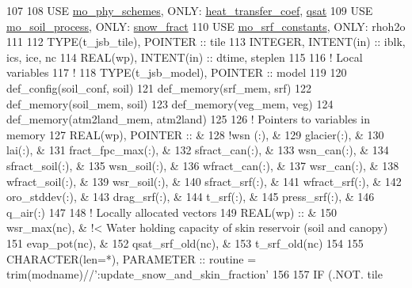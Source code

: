 \begin{DoxyCode}
107 
108     \textcolor{keywordtype}{USE }\hyperlink{namespacemo__phy__schemes}{mo\_phy\_schemes}\textcolor{keywordtype}{,    ONLY}: \hyperlink{namespacemo__phy__schemes_a9d1fe0b8e7cc0e86d2cf43ea5ebaac58}{heat\_transfer\_coef}, 
      \hyperlink{namespacemo__phy__schemes_aa793f9cf2db7aa0f821bde8fbf8f38a8}{qsat}
109     \textcolor{keywordtype}{USE }\hyperlink{namespacemo__soil__process}{mo\_soil\_process}\textcolor{keywordtype}{,   ONLY}: \hyperlink{namespacemo__soil__process_a20c4b80ccc8a10cb3028ff15293d3cc0}{snow\_fract}
110     \textcolor{keywordtype}{USE }\hyperlink{namespacemo__srf__constants}{mo\_srf\_constants}\textcolor{keywordtype}{,  ONLY}: rhoh2o
111 
112     \textcolor{keywordtype}{TYPE}(t\_jsb\_tile),  \textcolor{keywordtype}{POINTER}    :: tile
113     \textcolor{keywordtype}{INTEGER},           \textcolor{keywordtype}{INTENT(in)} :: iblk, ics, ice, nc
114     \textcolor{keywordtype}{REAL(wp)},          \textcolor{keywordtype}{INTENT(in)} :: dtime, steplen
115 
116     \textcolor{comment}{! Local variables}
117     \textcolor{comment}{!}
118     \textcolor{keywordtype}{TYPE}(t\_jsb\_model), \textcolor{keywordtype}{POINTER}    :: model
119 
120     def\_config(soil\_conf, soil)
121     def\_memory(srf\_mem, srf)
122     def\_memory(soil\_mem, soil)
123     def\_memory(veg\_mem, veg)
124     def\_memory(atm2land\_mem, atm2land)
125 
126     \textcolor{comment}{! Pointers to variables in memory}
127     \textcolor{keywordtype}{REAL(wp)}, \textcolor{keywordtype}{POINTER} :: &
128                                 \textcolor{comment}{!wsn           (:), &}
129       glacier(:), &
130       lai(:), &
131       fract\_fpc\_max(:), &
132       sfract\_can(:), &
133       wsn\_can(:), &
134       sfract\_soil(:), &
135       wsn\_soil(:), &
136       wfract\_can(:), &
137       wsr\_can(:), &
138       wfract\_soil(:), &
139       wsr\_soil(:), &
140       sfract\_srf(:), &
141       wfract\_srf(:), &
142       oro\_stddev(:), &
143       drag\_srf(:), &
144       t\_srf(:), &
145       press\_srf(:), &
146       q\_air(:)
147 
148     \textcolor{comment}{! Locally allocated vectors}
149     \textcolor{keywordtype}{REAL(wp)} :: &
150       wsr\_max(nc), &    !< Water holding capacity of skin reservoir (soil and canopy)
151       evap\_pot(nc), &
152       qsat\_srf\_old(nc), &
153       t\_srf\_old(nc)
154 
155     \textcolor{keywordtype}{CHARACTER(len=*)}, \textcolor{keywordtype}{PARAMETER} :: routine = trim(modname)//\textcolor{stringliteral}{':update\_snow\_and\_skin\_fraction'}
156 
157     \textcolor{keywordflow}{IF} (.NOT. tile%

\end{DoxyCode}
